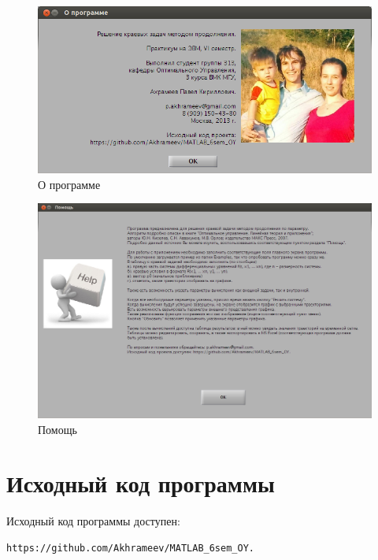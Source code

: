 \begin{figure}[h!] 
\begin{center}
\includegraphics[scale=0.5]{aboutWindow.jpeg}
\end{center}
\caption{О программе}
\label{aboutWindow_pic}
\end{figure}

\begin{figure}[h!] 
\begin{center}
\includegraphics[scale=0.3]{helpWindow.jpeg}
\end{center}
\caption{Помощь}
\label{helpWindow_pic}
\end{figure}
\newpage
\clearpage
\cleardoublepage
\section{Исходный код программы}

Исходный код программы доступен: 
\begin{lstlisting}
https://github.com/Akhrameev/MATLAB_6sem_OY.
\end{lstlisting}
